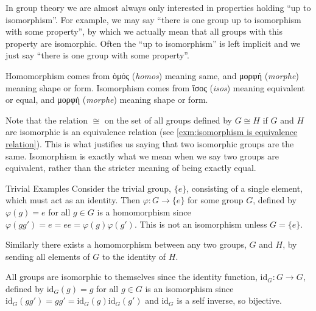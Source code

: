 \documentclass[fleqn]{NotesClass}
\newcommand*{\isomorphic}{\cong}
\begin{document}
    In group theory we are almost always only interested in properties holding \enquote{up to isomorphism}.
    For example, we may say \enquote{there is one group up to isomorphism with some property}, by which we actually mean that all groups with this property are isomorphic.
    Often the \enquote{up to isomorphism} is left implicit and we just say \enquote{there is one group with some property}.
    
    Homomorphism comes from \textgreek{ὁμός} (\textit{homos}) meaning same, and \textgreek{μορφή} (\textit{morphe}) meaning shape or form.
    Isomorphism comes from \textgreek{ἴσος} (\textit{isos}) meaning equivalent or equal, and \textgreek{μορφή} (\textit{morphe}) meaning shape or form.
    
    Note that the relation \(\isomorphic\) on the set of all groups defined by \(G \isomorphic H\) if \(G\) and \(H\) are isomorphic is an equivalence relation (see \cref{exm:isomorphism is equivalence relation}).
    This is what justifies us saying that two isomorphic groups are the same.
    Isomorphism is exactly what we mean when we say two groups are equivalent, rather than the stricter meaning of being exactly equal.
    
    \begin{exm}{Trivial Examples}{}
        Consider the trivial group, \(\{e\}\), consisting of a single element, which must act as an identity.
        Then \(\varphi\colon G \to \{e\}\) for some group \(G\), defined by \(\varphi(g) = e\) for all \(g \in G\) is a homomorphism since \(\varphi(gg') = e = ee = \varphi(g)\varphi(g')\).
        This is not an isomorphism unless \(G = \{e\}\).
        
        Similarly there exists a homomorphism between any two groups, \(G\) and \(H\), by sending all elements of \(G\) to the identity of \(H\).
        
        All groups are isomorphic to themselves since the identity function, \(\mathrm{id}_G\colon G \to G\), defined by \(\mathrm{id}_G(g) = g\) for all \(g \in G\) is an isomorphism since \(\mathrm{id}_G(gg') = gg' = \mathrm{id}_G(g)\mathrm{id}_G(g')\) and \(\mathrm{id}_G\) is a self inverse, so bijective.
    \end{exm}
    
\end{document}
